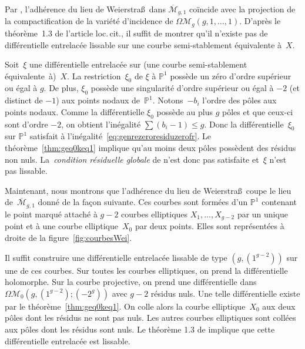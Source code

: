 \documentclass[11pt]{article}
\numberwithin{equation}{section}\renewcommand{\proofname}{Démonstration}
\let\mathcal\mathscr
\newcommand{\PP}{{\mathbb{P}}}
\newcommand{\barmoduli}[1][g]{{\overline{\mathcal M}}_{\!#1}}
\newcommand{\omoduli}[1][g]{{\Omega\mathcal M}_{\!#1}}
\newcommand{\Weierstrass}{Weierstra\ss{}}
\theoremstyle{definition}
\begin{document}
Par \cite[\S3.6]{BCGGM}, l'adhérence du lieu de \Weierstrass~dans $\barmoduli[g,1]$ coïncide avec la projection de la compactification de la variété d'incidence de $\omoduli[g](g,1,\dots,1)$. D'après le théorème~1.3 de l'article loc.\,cit., il suffit de montrer qu'il n'existe pas de différentielle entrelacée lissable sur une courbe semi-stablement équivalente à~$X$.

Soit~$\xi$ une différentielle entrelacée sur (une courbe semi-stablement équivalente~à)~$X$. La restriction~$\xi_{0}$ de $\xi$ à $\PP^{1}$ possède un zéro d'ordre supérieur ou égal à $g$. De plus, $\xi_{0}$ possède une singularité d'ordre supérieur ou égal à $-2$ (et distinct de $-1$) aux points nodaux de~$\PP^{1}$. Notons~$-b_{i}$ l'ordre des pôles aux points nodaux. Comme la différentielle $\xi_{0}$ possède au plus $g$ pôles et que ceux-ci sont d'ordre $-2$, on obtient l'inégalité $\sum (b_{i}-1) \leq g$. Donc la différentielle~$\xi_{0}$ sur $\PP^{1}$ satisfait à l'inégalité~\eqref{eq:genrezeroresiduzerofr}. Le théorème~\ref{thm:geq0keq1} implique qu'au moins deux pôles possèdent des résidus non nuls. La~\emph{condition résiduelle globale} de \cite[Def.\,1.2]{BCGGM} n'est donc pas satisfaite et~$\xi$ n'est pas lissable.

Maintenant, nous montrons que l'adhérence du lieu de \Weierstrass~coupe le lieu de~$\barmoduli[g,1]$ donné de la façon suivante. Ces courbes sont formées d'un $\PP^{1}$ contenant le point marqué attaché à $g-2$ courbes elliptiques $X_{1},\dots,X_{g-2}$ par un unique point et à une courbe elliptique~$X_{0}$ par deux points. Elles sont représentées à droite de la figure~\ref{fig:courbesWei}.

Il suffit construire une différentielle entrelacée lissable de type $(g,(1^{g-2}))$ sur une de ces courbes. Sur toutes les courbes elliptiques, on prend la différentielle holomorphe. Sur la courbe projective, on prend une différentielle dans $\omoduli[0](g,(1^{g-2});(-2^{g}))$ avec $g-2$ résidus nuls. Une telle différentielle existe par le théorème~\ref{thm:geq0keq1}. On colle alors la courbe elliptique~$X_{0}$ aux deux pôles dont les résidus ne sont pas nuls. Les autres courbes elliptiques sont collées aux pôles dont les résidus sont nuls. Le théorème 1.3 de \cite{BCGGM} implique que cette différentielle entrelacée est lissable.
\end{document}
